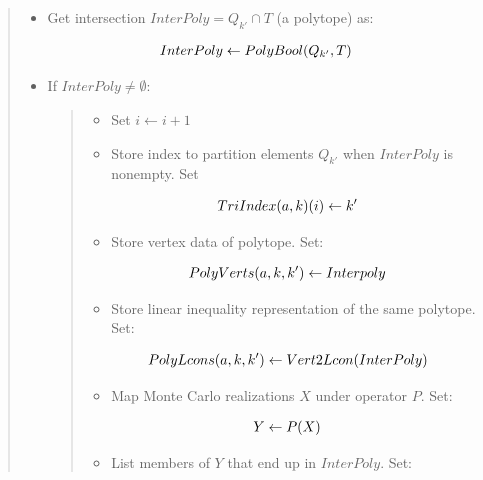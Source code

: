 \documentclass[a4paper,10pt,english]{sphinxmanual}
\begin{document}
{\begin{minipage}{0.95\linewidth}
\begin{itemize}
\begin{quote}
\begin{itemize}
\item {} 
Get intersection \(InterPoly = Q_{k'} \cap T\) (a polytope) as:

\end{itemize}
\begin{gather}
\begin{split}InterPoly \leftarrow PolyBool(Q_{k'},T)\end{split}\notag
\end{gather}\begin{itemize}
\item {} 
If \(InterPoly \neq \emptyset\):
\begin{quote}
\begin{itemize}
\item {} 
Set \(i \leftarrow i + 1\)

\item {} 
Store index to partition elements \(Q_{k'}\) when \(InterPoly\) is nonempty. Set

\end{itemize}
\begin{gather}
\begin{split}TriIndex(a,k)(i) \gets k'\end{split}\notag
\end{gather}\begin{itemize}
\item {} 
Store vertex data of polytope. Set:

\end{itemize}
\begin{gather}
\begin{split}PolyVerts(a,k,k') \gets Interpoly\end{split}\notag
\end{gather}\begin{itemize}
\item {} 
Store linear inequality representation of the same polytope. Set:

\end{itemize}
\begin{gather}
\begin{split}PolyLcons(a,k,k') \gets Vert2Lcon(InterPoly)\end{split}\notag
\end{gather}\begin{itemize}
\item {} 
Map Monte Carlo realizations \(X\) under operator \(P\). Set:

\end{itemize}
\begin{gather}
\begin{split}Y \gets P(X)\end{split}\notag
\end{gather}\begin{itemize}
\item {} 
List members of \(Y\) that end up in \(InterPoly\). Set:


\end{itemize}
\end{quote}
\end{itemize}
\end{quote}
\end{itemize}
\end{minipage}}
\end{document}
